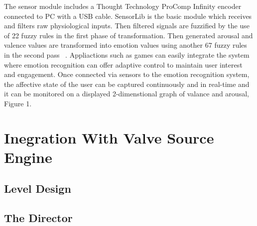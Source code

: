 The sensor module includes a Thought Technology ProComp Infinity 
encoder ~\cite{tt2013procomp} connected to PC with a USB cable.
SensorLib is the basic module which receives and filters raw
physiological inputs. Then filtered signals are fuzzified by
the use of 22 fuzzy rules in the first phase of transformation.
Then generated arousal and valence values are transformed into
emotion values using another 67 fuzzy rules in
the second pass ~\cite{mandryk2007fuzzy}. Appliactions such as games can easily 
integrate the system where emotion recognition can offer
adaptive control to maintain user interest and engagement.
Once connected via sensors to the emotion recognition system, 
the affective state of the user can be captured continuously and
in real-time and it can be monitored on a displayed
2-dimenstional graph of valance and arousal, Figure 1.

\section{Inegration With Valve Source Engine}
\subsection{Level Design}
\subsection{The Director}
